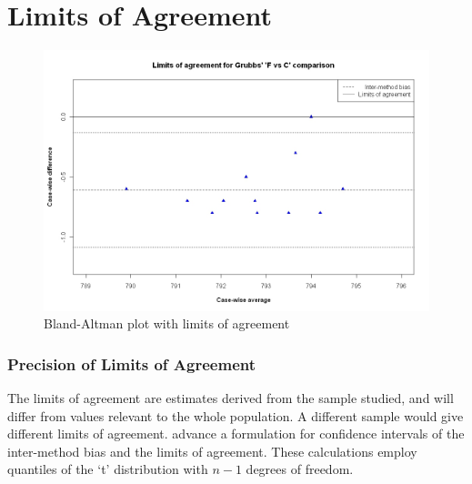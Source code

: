 \documentclass[Main.tex]{subfiles}
\begin{document}

\section{Limits of Agreement}




\begin{figure}[h!]
	\begin{center}
		\includegraphics[width=125mm]{images/GrubbsBAplot-LOA.jpeg}
		\caption{Bland-Altman plot with limits of agreement}\label{GrubbsBAplot-noLOA}
	\end{center}
\end{figure}


\subsubsection{Precision of Limits of Agreement}
The limits of agreement are estimates derived from the sample
studied, and will differ from values relevant to the whole
population. A different sample would give different limits of
agreement. \citet*{BA86} advance a formulation for confidence
intervals of the inter-method bias and the limits of agreement.
These calculations employ quantiles of the `t' distribution with
$n -1$ degrees of freedom.

\end{document}
